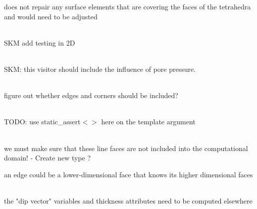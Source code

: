 \begin{DoxyRefList}
\label{todo__todo000084}%
%
does not repair any surface elements that are covering the faces of the tetrahedra and would need to be adjusted 
\item[Member \doxylink{classcsmp_1_1_box___test_aee3d8adfb35c424244b249a987dcfe4e}{csmp\+::Box\+\_\+\+Test\+::run} ()]\hfill \\
\label{todo__todo000257}%
%
SKM add testing in 2D  
\item[Class \doxylink{classcsmp_1_1_brittle_failure_visitor}{csmp\+::Brittle\+Failure\+Visitor\texorpdfstring{$<$}{<} dim \texorpdfstring{$>$}{>}} ]\hfill \\
\label{todo__todo000220}%
%
SKM\+: this visitor should include the influence of pore pressure. 
\item[Member \doxylink{group___c_s_m_pglobal_functions_ga67c628137703b7561fe920a1eb20b12f}{csmp\+::can\+Be\+IRREGULAR} (\doxylink{group___c_s_m_pglobal_enums_ga8e4421c3cd02f67e535bceb2dc74bfb6}{BOX\+\_\+\+BOUNDARY})]\hfill \\
\label{todo__todo000141}%
%
figure out whether edges and corners should be included?  
\item[Member \doxylink{namespacecsmp_af417f5aa4911fde67c3189145f80a45e}{csmp\+::check\+Neighbor\+Normals\+For\+Consistent\+Orientation} (const \doxylink{classcsmp_1_1_region}{Region$<$ 1\+U $>$} \&subdomain)]\hfill \\
\label{todo__todo000159}%
%
TODO\+: use static\+\_\+assert$<$$>$ here on the template argument  
\item[Member \doxylink{namespacecsmp_a276b39d42a9c119fb4164354663662cf}{csmp\+::collect\+Interfaces\+In\+Computation\+Region} (const \doxylink{classcsmp_1_1_model}{Model$<$ dim $>$} \&model, const \doxylink{classcsmp_1_1_model_sub_domain}{Model\+Sub\+Domain$<$ dim, Element $>$} \&comp\+\_\+domain, vector\texorpdfstring{$<$}{<} const \doxylink{classcsmp_1_1_inter_face}{Inter\+Face$<$ dim $>$} \texorpdfstring{$\ast$}{*} \texorpdfstring{$>$}{>} \&splitboundary\+\_\+interfaces)]\hfill \\
\label{todo__todo000104}%
%
we must make sure that these line faces are not included into the computational domain! -\/ Create new type ? 



an edge could be a lower-\/dimensional face that knows its higher dimensional faces 
\item[Member \doxylink{namespacecsmp_a2f45329af1de0666a3dbcd480b8e2b6c}{csmp\+::compute\+FV\+\_\+\+Diameter\+\_\+\+Normal\+\_\+\+Vertical\+Extent} (\doxylink{classcsmp_1_1_model}{Model$<$ dim $>$} \&model, const std\+::string \&region\+\_\+name)]\hfill \\
\label{todo__todo000028}%
%
the "{}dip vector"{} variables and thickness attributes need to be computed elsewhere 


\end{DoxyRefList}
